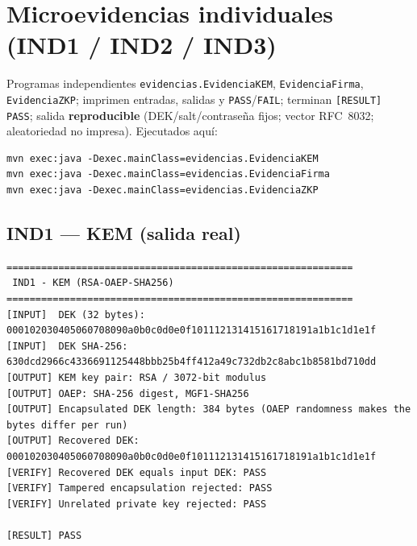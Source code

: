 \documentclass[11pt,a4paper]{article}
\begin{document}
\section{Microevidencias individuales (IND1 / IND2 / IND3)}\label{sec:micro}
Programas independientes \texttt{evidencias.EvidenciaKEM}, \texttt{EvidenciaFirma},
\texttt{EvidenciaZKP}; imprimen entradas, salidas y \texttt{PASS}/\texttt{FAIL};
terminan \texttt{[RESULT] PASS}; salida \textbf{reproducible} (DEK/salt/contraseña
fijos; vector RFC~8032; aleatoriedad no impresa). Ejecutados aquí:
\begin{lstlisting}
mvn exec:java -Dexec.mainClass=evidencias.EvidenciaKEM
mvn exec:java -Dexec.mainClass=evidencias.EvidenciaFirma
mvn exec:java -Dexec.mainClass=evidencias.EvidenciaZKP
\end{lstlisting}

\subsection*{IND1 --- KEM (salida real)}
\begin{lstlisting}
============================================================
 IND1 - KEM (RSA-OAEP-SHA256)
============================================================
[INPUT]  DEK (32 bytes): 000102030405060708090a0b0c0d0e0f101112131415161718191a1b1c1d1e1f
[INPUT]  DEK SHA-256:    630dcd2966c4336691125448bbb25b4ff412a49c732db2c8abc1b8581bd710dd
[OUTPUT] KEM key pair: RSA / 3072-bit modulus
[OUTPUT] OAEP: SHA-256 digest, MGF1-SHA256
[OUTPUT] Encapsulated DEK length: 384 bytes (OAEP randomness makes the bytes differ per run)
[OUTPUT] Recovered DEK: 000102030405060708090a0b0c0d0e0f101112131415161718191a1b1c1d1e1f
[VERIFY] Recovered DEK equals input DEK: PASS
[VERIFY] Tampered encapsulation rejected: PASS
[VERIFY] Unrelated private key rejected: PASS

[RESULT] PASS
\end{lstlisting}
\end{document}
